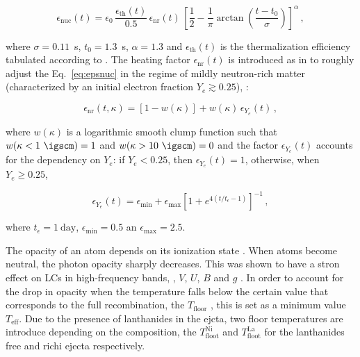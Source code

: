 \begin{equation}
\label{eq:epsnuc}
\epsilon_{\text{nuc}}(t)= \epsilon_0 \, \frac{\epsilon_{\text{th}}(t)}{0.5} \, \epsilon_{\text{nr}}(t) \,\left[ \frac{1}{2} - \frac{1}{\pi} \arctan\left(\frac{t-t_0}{\sigma}\right)\right]^{\alpha}\,,
\end{equation}

where $\sigma = 0.11$~s, $t_0 = 1.3$~s, $\alpha=1.3$ and $\epsilon_{\text{th}}(t)$ is the thermalization 
efficiency tabulated according to \citet{Barnes:2016umi}.
The heating factor $\epsilon_{\text{nr}}(t) $ is introduced as in \citet{Perego:2017wtu} to roughly adjust the Eq.~\eqref{eq:epsnuc} in the regime of mildly neutron-rich matter (characterized by an initial electron fraction $Y_e \gtrsim 0.25$), \citep[see, \eg][]{Martin:2015hxa}:

\begin{equation}
\label{eq:epsnr}
\epsilon_{\text{nr}}(t,\kappa) = \left[1-w(\kappa)\right] + w(\kappa)\,\epsilon_{Y_e}(t)\,,  
\end{equation}

where $w(\kappa)$ is a logarithmic smooth clump function such that $w(\kappa < 1~\igscm) = 1$ and 
$w(\kappa > 10~\igscm)=0$ and the factor $\epsilon_{Y_e}(t)$ accounts for the dependency on $Y_e$:
if $Y_e < 0.25$, then $\epsilon_{Y_e}(t)=1$, otherwise, when $Y_e \ge 0.25$,

\begin{equation}
\label{eq:epsye}
\epsilon_{Y_e}(t) =\epsilon_{\text{min}}+{\epsilon_{\text{max}}}{\left[1+ e ^{4(t/t_\epsilon-1)}\right]}^{-1}\,,
\end{equation}

where $t_\epsilon = 1~{\text{day}}$, $\epsilon_{\text{min}}=0.5$ an $\epsilon_{\text{max}} = 2.5$.

The opacity of an atom depends on its ionization state . When atoms become neutral, the photon opacity sharply decreases. This was shown to have a stron effect on \acp{LC} in high-frequency bands, \eg, $V$, $U$, $B$ and $g$ \citep{Villar:2017oya}.
In order to account for the drop in opacity when the temperature falls below the certain value that corresponds to the full recombination, the $T_{\text{floor}}$ \cite{Kasen:2017sxr,Kasen:2018drm}, 
this is set as a minimum value $T_{\text{eff}}$.
Due to the presence of lanthanides in the ejcta, two floor 
temperatures are introduce depending on the composition,
the $T_{\text{floot}}^{\text{Ni}}$ and $T_{\text{floot}}^{\text{La}}$ for the lanthanides free and richi ejecta respectively.


